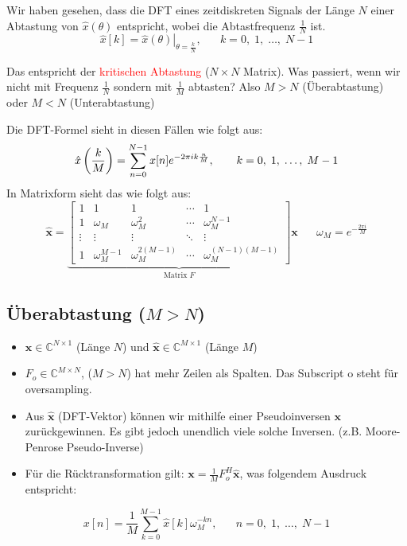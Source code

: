 \documentclass[11pt]{article}
\begin{document}
\pagebreak

Wir haben gesehen, dass die DFT eines zeitdiskreten Signals der Länge $N$ einer Abtastung von $\hat{x}(\theta)$ entspricht, wobei die Abtastfrequenz $\frac{1}{N}$ ist.
$$\hat{x}[k] = \left.\hat{x}(\theta)\right|_{\theta = \frac{k}{N}}, \hspace{20pt} k = 0, \; 1, \; \dots, \; N-1$$

Das entspricht der \textcolor{red}{kritischen Abtastung} ($N \times N$ Matrix). Was passiert, wenn wir nicht mit Frequenz $\frac{1}{N}$ sondern mit $\frac{1}{M}$ abtasten? Also $M > N$ (Überabtastung) oder $M < N$ (Unterabtastung)

Die DFT-Formel sieht in diesen Fällen wie folgt aus:
\vspace*{-0.25cm}
$$\hat{x}\left(\frac{k}{M}\right) = \sum_{n=0}^{N-1}x[n]e^{-2 \pi i k \frac{n}{M}}, \hspace*{20pt} k = 0, \; 1, \; \dots, \; M-1$$
In Matrixform sieht das wie folgt aus:
$$\hat{\mathbf{x}} = \underbrace{\begin{bmatrix}
    1 & 1 & 1 & \cdots & 1 \\
    1 & \omega_M & \omega_M^2 & \cdots & \omega_M^{N-1} \\
    \vdots & \vdots & \vdots & \ddots & \vdots \\
    1 & \omega_M^{M-1} & \omega_M^{2(M-1)} & \cdots & \omega_M^{(N-1)(M-1)}
\end{bmatrix}}_{\text{Matrix }F} \mathbf{x} \hspace{20pt} \omega_M = e^{-\frac{2 \pi i}{M}}$$

\vspace*{-0.25cm}
\subsection*{Überabtastung ($M > N$)}
\vspace*{-0.5cm}
\begin{itemize}
    \item $\mathbf{x} \in \mathbb{C}^{N \times 1}$ (Länge $N$) und $\hat{\mathbf{x}} \in \mathbb{C}^{M \times 1}$ (Länge $M$)
    \item $F_o \in \mathbb{C}^{M\times N}$, ($M > N$) hat mehr Zeilen als Spalten. Das Subscript o steht für oversampling.
    \item Aus $\hat{\mathbf{x}}$ (DFT-Vektor) können wir mithilfe einer Pseudoinversen $\mathbf{x}$ zurückgewinnen. Es gibt jedoch unendlich viele solche Inversen. (z.B. Moore-Penrose Pseudo-Inverse)
    \item Für die Rücktransformation gilt: $\mathbf{x} = \displaystyle\frac{1}{M} F_o^H \hat{\mathbf{x}}$, was folgendem Ausdruck entspricht:
\end{itemize}
\vspace*{-0.5cm}
$$x[n] = \frac{1}{M} \sum_{k=0}^{M-1} \hat{x}[k]\omega_M^{-kn}, \hspace{20pt} n = 0, \; 1, \; \dots, \; N-1$$
\end{document}
